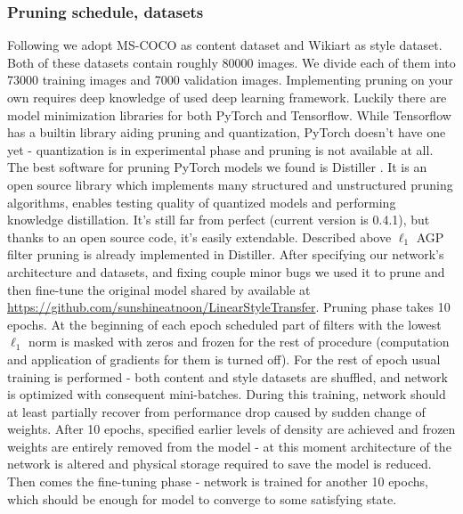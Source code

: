 \documentclass[../Main.tex]{subfiles}
\begin{document}
    \subsubsection{Pruning schedule, datasets} 
    Following \cite{Li2018} we adopt MS-COCO \cite{mscoco} as content dataset and Wikiart \cite{wikiart}
    as style dataset. Both of these datasets contain roughly 80000 images. We divide each of them 
    into 73000 training images and 7000 validation images. Implementing pruning on your own
    requires deep knowledge of used deep learning framework. Luckily there are model 
    minimization libraries for both PyTorch and Tensorflow. While Tensorflow has 
    a builtin library aiding pruning and quantization, PyTorch doesn't have one yet - 
    quantization is in experimental phase and pruning is not available at all. The best 
    software for pruning PyTorch models we found is Distiller \cite{distiller}.
    It is an open source library which implements many structured and unstructured
    pruning algorithms, enables testing quality of quantized models and performing
    knowledge distillation. It's still far from perfect (current version is 0.4.1), but 
    thanks to an open source code, it's easily extendable. Described above
    $\ell_1$ AGP filter pruning is already implemented in Distiller. After specifying
    our network's architecture and datasets, and fixing couple minor bugs 
    we used it to prune and then fine-tune the 
    original model shared by \cite{Li2018} available at
    \url{https://github.com/sunshineatnoon/LinearStyleTransfer}. 
    Pruning phase takes 10 epochs. At the beginning of each epoch scheduled part of filters
    with the lowest $\ell_1$ norm is masked with zeros and frozen for the rest of procedure
    (computation and application of gradients for them is turned off). For the rest of 
    epoch usual training is performed - both content and style datasets are shuffled,
    and network is optimized with consequent mini-batches. During this training,
    network should at least partially recover from performance drop caused by sudden
    change of weights. After 10 epochs, specified earlier
    levels of density are achieved and frozen weights are entirely removed
    from the model - at this moment architecture of the network is altered and physical
    storage required to save the model is reduced. Then comes the fine-tuning phase - 
    network is trained for another
    10 epochs, which should be enough for model to converge to some satisfying state.
    
\end{document}
